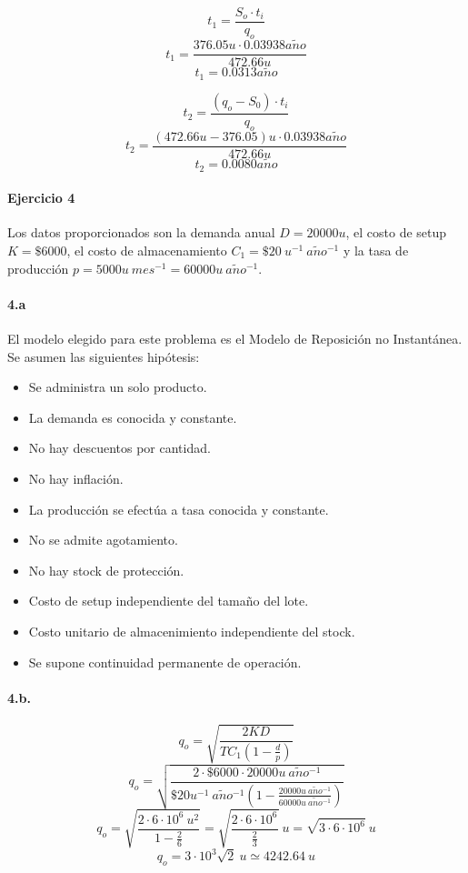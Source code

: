 \documentclass{article}
\def \anio {a\tilde{n}o}
\begin{document}
  $$t_1 = \frac{S_o \cdot t_i}{q_o} $$
  $$t_1 = \frac{376.05 u \cdot 0.03938 \anio}{472.66 u} $$
  $$\boxed{t_1 = 0.0313 \anio}$$

  $$t_2 = \frac{(q_o - S_0) \cdot t_i}{q_o} $$
  $$t_2 = \frac{(472.66 u - 376.05) u \cdot 0.03938 \anio}{472.66 u} $$
  $$\boxed{t_2 = 0.0080 \anio} $$
  
 
\paragraph{Ejercicio 4}
    Los datos proporcionados son la demanda anual $ D = 20000 u $, el costo de setup $ K = \$6000 $, el costo de almacenamiento $ C_1 = \$20\ u^{-1}\ \anio^{-1} $ y la tasa de producción $ p = 5000u\ mes^{-1} = 60000u\ \anio^{-1}$.

    \paragraph{4.a}
    El modelo elegido para este problema es el Modelo de Reposición no Instantánea. Se asumen las siguientes hipótesis:
        \begin{itemize}
            \item Se administra un solo producto.
            \item La demanda es conocida y constante.
            \item No hay descuentos por cantidad.
            \item No hay inflación.
            \item La producción se efectúa a tasa conocida y constante.
            \item No se admite agotamiento.
            \item No hay stock de protección.
            \item Costo de setup independiente del tamaño del lote.
            \item Costo unitario de almacenimiento independiente del stock.
            \item Se supone continuidad permanente de operación.
        \end{itemize}

    \paragraph{4.b.} 
        $$ q_o = \sqrt{ \frac{2KD}{TC_1 \left( 1 - \frac{d}{p} \right)} } $$
        $$ q_o = \sqrt{ \frac{2 \cdot \$ 6000 \cdot 20000u\ \anio^{-1}}{\$20 u^{-1}\ \anio^{-1} \left( 1 - \frac{20000u\ \anio^{-1}}{60000u\ \anio^{-1}} \right)} } $$
        $$ q_o = \sqrt{ \frac{2 \cdot 6 \cdot 10^6\ u^2}{1 - \frac{2}{6}} } = \sqrt{ \frac{2 \cdot 6 \cdot 10^6}{\frac{2}{3}} }\ u = \sqrt{ 3 \cdot 6 \cdot 10^6 }\ u $$
        $$ \boxed{ q_o = 3 \cdot 10^3 \sqrt {2}\ u \simeq 4242.64\ u } $$
\end{document}

